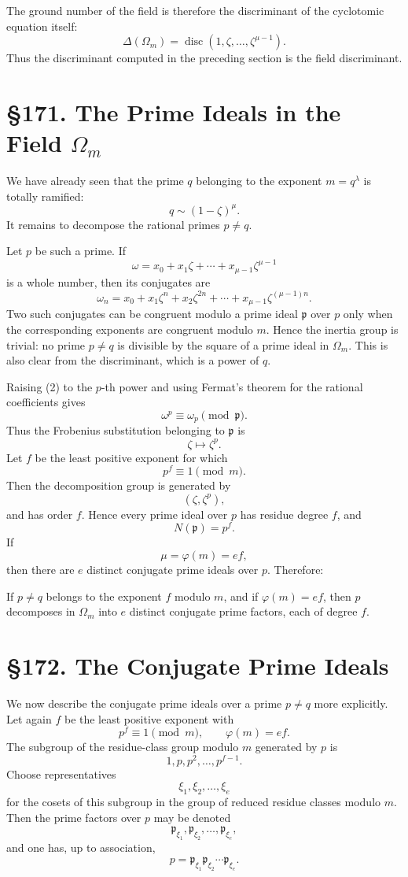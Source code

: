 \documentclass[12pt,a4paper]{article}
\newcommand{\webersection}[2]{\clearpage\section*{\S #1. #2}}
\newcommand{\p}{\mathfrak p}
\newcommand{\disc}{\operatorname{disc}}
\begin{document}
The ground number of the field is therefore the discriminant of the cyclotomic equation itself:
\[
  \Delta(\Omega_m)=\disc(1,\zeta,\ldots,\zeta^{\mu-1}).
\tag{6}
\]
Thus the discriminant computed in the preceding section is the field discriminant.

\webersection{171}{The Prime Ideals in the Field \(\Omega_m\)}

We have already seen that the prime \(q\) belonging to the exponent \(m=q^\lambda\) is totally ramified:
\[
  q\sim (1-\zeta)^\mu.
\]
It remains to decompose the rational primes \(p\ne q\).

Let \(p\) be such a prime.  If
\[
  \omega=x_0+x_1\zeta+\cdots+x_{\mu-1}\zeta^{\mu-1}
\tag{1}
\]
is a whole number, then its conjugates are
\[
  \omega_n=x_0+x_1\zeta^n+x_2\zeta^{2n}+\cdots+x_{\mu-1}\zeta^{(\mu-1)n}.
\tag{2}
\]
Two such conjugates can be congruent modulo a prime ideal \(\p\) over \(p\) only when the corresponding exponents are congruent modulo \(m\).  Hence the inertia group is trivial: no prime \(p\ne q\) is divisible by the square of a prime ideal in \(\Omega_m\).  This is also clear from the discriminant, which is a power of \(q\).

Raising (2) to the \(p\)-th power and using Fermat's theorem for the rational coefficients gives
\[
  \omega^p\equiv \omega_p \pmod{\p}.
\tag{3}
\]
Thus the Frobenius substitution belonging to \(\p\) is
\[
  \zeta\mapsto\zeta^p.
\]
Let \(f\) be the least positive exponent for which
\[
  p^f\equiv1\pmod m.
\tag{4}
\]
Then the decomposition group is generated by
\[
  (\zeta,\zeta^p),
\]
and has order \(f\).  Hence every prime ideal over \(p\) has residue degree \(f\), and
\[
  N(\p)=p^f.
\tag{5}
\]
If
\[
  \mu=\varphi(m)=ef,
\]
then there are \(e\) distinct conjugate prime ideals over \(p\).  Therefore:

If \(p\ne q\) belongs to the exponent \(f\) modulo \(m\), and if \(\varphi(m)=ef\), then \(p\) decomposes in \(\Omega_m\) into \(e\) distinct conjugate prime factors, each of degree \(f\).

\webersection{172}{The Conjugate Prime Ideals}

We now describe the conjugate prime ideals over a prime \(p\ne q\) more explicitly.  Let again \(f\) be the least positive exponent with
\[
  p^f\equiv1\pmod m,\qquad \varphi(m)=ef.
\tag{1}
\]
The subgroup of the residue-class group modulo \(m\) generated by \(p\) is
\[
  1,p,p^2,\ldots,p^{f-1}.
\tag{2}
\]
Choose representatives
\[
  \xi_1,\xi_2,\ldots,\xi_e
\]
for the cosets of this subgroup in the group of reduced residue classes modulo \(m\).  Then the prime factors over \(p\) may be denoted
\[
  \p_{\xi_1},\p_{\xi_2},\ldots,\p_{\xi_e},
\]
and one has, up to association,
\[
  p=\p_{\xi_1}\p_{\xi_2}\cdots\p_{\xi_e}.
\tag{3}
\]
\end{document}
